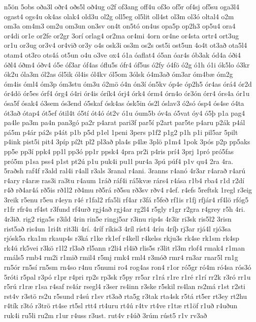 {n5ön
5obs
oða3l
oðr4
oðs5l
oð4ug
o2f
of3ang
off4u
of3o
of5r
of4sj
of5su
oga3l4
ogast4
ogs4u
ok4as
olak4
old3u
ol2g
oll5eg
ol5lit
oll4st
ol3m
ol3ó
oltal4
o2m
om3a
om4m3
om2u
om3un
on3sv
on4t
on5tó
on4us
opa5p
op2h3
op5u4
ora4
or4di
or1e
or2fe
or2gr
3orí
orlag4
or2ma
or4mi
4orn
or4ne
or4sta
ortr4
ort3ug
or1u
or3ug
or3v4
or4við
or3y
o4s
osk3i
os3m
os2s
ost5i
ost5un
4o4t
ot3að
ota5l4
otam4
ot3ro
ots4á
ot5un
o4u
o3ve
ox4
ó1a
óaflat4
ó5an
óar4s
ób3ak
ód4a
óði4
óðl4
óðm4
óðv4
ó5e
óf3ar
óf4as
óflu5s
ófr4
óf5us
ó2fy
ó4fö
ó2g
ó1h
ó1i
ók5lo
ó3kr
ók2u
óla3m
ól2as
ól5ik
ól4is
ól4kv
ól5om
3ólsk
ó4m3að
óm3ar
óm4bæ
óm2g
óm4is
óml4
óm3p
óm3stu
óm3u
ó2mö
ó4n
ón3í
ón5kv
óp4e
óp2h5
ór4as
órá4
ór2d
ór4dö
ór5es
órf4
órg4
ó4ri
ór4is
órík4
órj4
órk4
órm4
órn4o
ór3ón
órr4
órs4a
ór1u
ósa5f
ósak4
ó3sem
ós3end
ó5skaf
ósk4as
ósk5in
ós2l
óslav3
ó2só
ósp4
ós4se
ó4ta
ót3að
ótap4
ót5ef
ótil4t
ó5tí
ót4ó
ót2v
ó1u
óum5b
óv4a
ó5vat
óy4
ó5þ
p1a
pag4
pa4le
pa3m
pa4n
pan3gó
pa2r
p4arat
pari3f
par5í
p2art
par5te
p4aru
p2ák
p4ál
pá5m
p4ár
pá2s
p4át
p1b
p5d
p1el
1peni
3pers
p1f2
p1g2
p1h
p1i
pil5ar
5pilt
p4ink
pist5i
pit4
3píp
pí2t
pl2
pl3að
pla4s
p4læ
3plö
p1m4
1pok
3pós
p2p
pp5aks
pp5e
pp3í
ppk4
pp1l
pp3ó
pp1r
ppsk4
4pra
pr2i
p4ris
prí4
3prj
1pró
pró5fas
pró5m
p1sa
pss4
p1st
pt2ú
p1u
puk4i
pu1l
pur4a
3pú
púf4
p1v
qu4
2ra
4ra.
5raðsh
raf4f
r3ald
ral4i
r4all
r3als
3ranal
r4ani.
3ranns
r4anó
4r3ar
r4arað
r4arú
r4ary
r4aræ
ras3i
ra3tu
r4aum
1ráð
ráf4i
rá5kvæ
rárs4
r4ása
r1b4
rba4
r1d
r2dí
r4ð
rð4ar4á
rð5is
rð1l2
rð4mu
rð5rá
rð5su
rð3sv
rðv4
r4ef.
r4efs
5reftsk
1regl
r3eig
3reik
r5enu
r5eu
r4eyn
r4é
r1fal2
rfa5li
rf4ar
r3fá
r5feð
rf1is
r1fj
rfjár4
rf4lö
rfóg5
r1fr
rfr4u
rf4st
r3fund
rf4urð
rgj4að
rgj4ar
rg2l4
r5gly
r1gr
r2gra
r4grey
r5h
4ri.
4r3ið.
rig2
riga5s
r3ild
4rin
rin5e
ringj5ar
r3inu
rip4s
4r3ir
ri3sk
ris5l2
3risn
rist5að
ris4un
1ri4t
rit3li
4rí.
4ríf
ríkis3
4ríl
ríst4
4ríu
4ríþ
rj3ar
rjá4l
rjó3sa
rjósk5a
rka1m
rkaup4s
r3ká
r1ke
rk1ef
r4kell
r4kelss
rkju3s
rk4se
rk1sm
rk4sp
rk4ú
rk5vei
r3kö
r1l2
rl3að
rl5ann
r2li4
rl4ið
rlis5s
r3lit
rl3m
rlof4
rmak4
r1man
rmáls5
rmb4
rm2i
r1mið
rmil4
r5mj
rmk4
rml4
r3móð
rmr4
rn3ar
rnar5l
rn1g
rn5ór
rn5sí
rn5sm
rn4so
r4nu
r5numi
ro4
rog4as
ron4
r1or
ró5gr
ró4m
ró4sa
rós3ó
5róti
r5pal
r3pó
r1pr
r4pri
rp2s
rp3sk
r5py
rr5ar
r1rá
r1re
r1ré
r1rí
rr2k
r3ró
rr1u
r5rú
r1ræ
r1sa
r4saf
rs4ár
rsegl4
r3ser
rs4inn
r3ske
r5skil
rs4lan
rs2má
r1st
r2sti
rst4v
r3stö
rs2u
r5sund
r4sú
r1sv
rt3að
rta5g
r3tak
rta4sk
r5tá
rt5er
rt3ey
rt2hu
r4tík
r3tó
r3trö
rt4se
rt5sl
rtt4
rt4uru
rt4ú
r4tv
rt4ve
r1tæ
rt1öf
r1uð
r4uðun
ruk4i
ru5li
ru2m
r1ur
r4uss
r3ust.
rut4v
r4úð
3rúm
rúst5
r1v
rv3að
}
